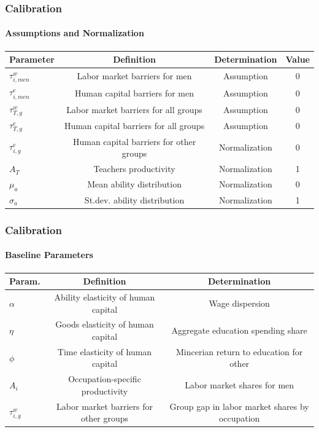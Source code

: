 \documentclass[11pt]{beamer}
\begin{document}
		\begin{frame}
			\frametitle{Calibration}
			\framesubtitle{Assumptions and Normalization}
			\scriptsize
			\begin{table}[h!]
				\centering
				\begin{tabular}{lccc}
					\toprule
					\toprule
					Parameter & Definition & Determination & Value\\
					\midrule
					$\tau^{w}_{i,men}$ & Labor market barriers for men & Assumption & 0\\
					$\tau^{e}_{i,men}$ & Human capital barriers for men & Assumption & 0\\
					$\tau^{w}_{T,g}$ & Labor market barriers for all groups & Assumption & 0\\
					$\tau^{e}_{T,g}$ & Human capital barriers for all groups & Assumption & 0\\
					$\tau^{e}_{i,g}$ & Human capital barriers for other groups & Normalization & 0\\
					$A_{T}$ & Teachers productivity & Normalization & 1\\
					$\mu_a$ & Mean ability distribution & Normalization & 0\\
					$\sigma_a$ & St.dev. ability distribution & Normalization & 1\\
					\bottomrule
				\end{tabular}
				\label{tab:assump}
			\end{table}
		\end{frame}
		
		\begin{frame}
			\frametitle{Calibration}
			\framesubtitle{Baseline Parameters}
			\tiny
			\begin{table}[h!]
				\centering
				\begin{tabular}{lcc}
					\toprule
					\toprule
					Param. & Definition & Determination\\
					\midrule
					$\alpha$ & Ability elasticity of human capital & Wage dispersion \\
					$\eta$ & Goods elasticity of human capital & Aggregate education spending share  \\
					$\phi$ & Time elasticity of human capital & Mincerian return to education for other \\
					$A_{i}$ & Occupation-specific productivity & Labor market shares for men\\
					$\tau^{w}_{i,g}$ & Labor market barriers for other groups & Group gap in labor market shares by occupation\\
					\bottomrule
				\end{tabular}
				\label{tab:param}
			\end{table}
		\end{frame}
		
\end{document}
